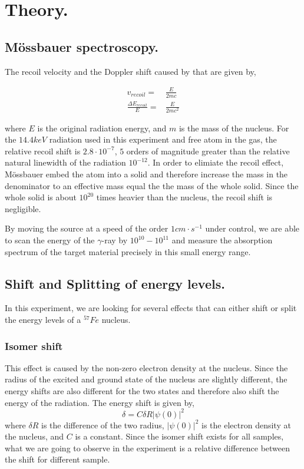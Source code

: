 \documentclass[aps,twocolumn,secnumarabic,balancelastpage,amsmath,amssymb,nofootinbib]{revtex4}
\newcommand{\eqar}[1]
{
  \begin{align*}
    #1
  \end{align*}
}
\newcommand{\dexp}[2]{\ensuremath{{#1}\cdot10^{#2}}}
\newcommand{\abs}[1]{{\left|{#1}\right|}}
\begin{document}
\section{Theory.}
\subsection{M\"{o}ssbauer spectroscopy.}
The recoil velocity and the Doppler shift caused by that are given by,
\eqar{
  v_{recoil}=&\frac{E}{2mc}\\
  \frac{\Delta E_{recoil}}{E}=&\frac{E}{2mc^2}
}
where $E$ is the original radiation energy, and $m$ is the mass of the nucleus. For the $14.4keV$ radiation used in this experiment and free atom in the gas, the relative recoil shift is $\dexp{2.8}{-7}$, $5$ orders of magnitude greater than the relative natural linewidth of the radiation $10^{-12}$. In order to elimiate the recoil effect, M\"{o}ssbauer embed the atom into a solid and therefore increase the mass in the denominator to an effective mass equal the the mass of the whole solid. Since the whole solid is about $10^{20}$ times heavier than the nucleus, the recoil shift is negligible.

By moving the source at a speed of the order $1cm\cdot s^{-1}$ under control, we are able to scan the energy of the $\gamma$-ray by $10^{10}-10^{11}$ and measure the absorption spectrum of the target material precisely in this small energy range.

\subsection{Shift and Splitting of energy levels.}
In this experiment, we are looking for several effects that can either shift or split the energy levels of a ${}^{57}Fe$ nucleus.

\subsubsection{Isomer shift}
This effect is caused by the non-zero electron density at the nucleus. Since the radius of the excited and ground state of the nucleus are slightly different, the energy shifts are also different for the two states and therefore also shift the energy of the radiation. The energy shift is given by,
\[\delta = C\delta R\abs{\psi(0)}^2\]
where $\delta R$ is the difference of the two radius, $\abs{\psi(0)}^2$ is the electron density at the nucleus, and $C$ is a constant. Since the isomer shift exists for all samples, what we are going to observe in the experiment is a relative difference between the shift for different sample.
\end{document}
